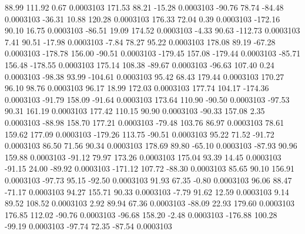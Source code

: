        88.99      111.92        0.67     0.0003103
      171.53       88.21      -15.28     0.0003103
      -90.76       78.74      -84.48     0.0003103
      -36.31       10.88      120.28     0.0003103
      176.33       72.04        0.39     0.0003103
     -172.16       90.10       16.75     0.0003103
      -86.51       19.09      174.52     0.0003103
       -4.33       90.63     -112.73     0.0003103
        7.41       90.51      -17.98     0.0003103
       -7.84       78.27       95.22     0.0003103
      178.08       89.19      -67.28     0.0003103
     -178.78      156.00      -90.51     0.0003103
     -179.45      157.08     -179.44     0.0003103
      -85.71      156.48     -178.55     0.0003103
      175.14      108.38      -89.67     0.0003103
      -96.63      107.40        0.24     0.0003103
      -98.38       93.99     -104.61     0.0003103
       95.42       68.43      179.44     0.0003103
      170.27       96.10       98.76     0.0003103
       96.17       18.99      172.03     0.0003103
      177.74      104.17     -174.36     0.0003103
      -91.79      158.09      -91.64     0.0003103
      173.64      110.90      -90.50     0.0003103
      -97.53       90.31      161.19     0.0003103
      177.42      110.15       90.90     0.0003103
      -90.33      157.08        2.35     0.0003103
      -88.98      158.70      177.21     0.0003103
      -79.48      103.76       86.97     0.0003103
       78.61      159.62      177.09     0.0003103
     -179.26      113.75      -90.51     0.0003103
       95.22       71.52      -91.72     0.0003103
       86.50       71.56       90.34     0.0003103
      178.69       89.80      -65.10     0.0003103
      -87.93       90.96      159.88     0.0003103
      -91.12       79.97      173.26     0.0003103
      175.04       93.39       14.45     0.0003103
      -91.15       24.00      -89.92     0.0003103
     -171.12      107.72      -88.30     0.0003103
       85.65       90.10      156.91     0.0003103
      -97.73       95.15      -92.50     0.0003103
       91.93       67.35       -0.80     0.0003103
       96.06       88.47      -71.17     0.0003103
       94.27      155.71       90.33     0.0003103
       -7.79       91.62       12.59     0.0003103
        9.14       89.52      108.52     0.0003103
        2.92       89.94       67.36     0.0003103
      -88.09       22.93      179.60     0.0003103
      176.85      112.02      -90.76     0.0003103
      -96.68      158.20       -2.48     0.0003103
     -176.88      100.28      -99.19     0.0003103
      -97.74       72.35      -87.54     0.0003103
